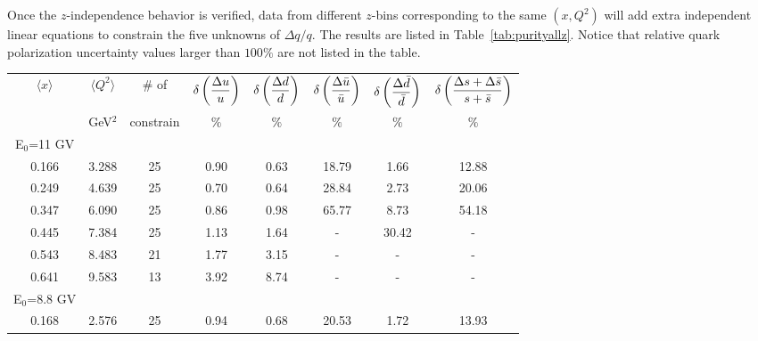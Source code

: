 Once the $z$-independence behavior is verified, data from different $z$-bins corresponding to the same $(x,Q^2)$ will add extra independent linear equations to constrain the five unknowns of $\Delta q/q$. The results are listed in Table~\ref{tab:purityallz}. Notice that relative quark polarization  uncertainty values larger than $100 \%$ are not listed in the table.  
%
\begin{table}[htbp]
\begin{center}
\begin{tabular}{|ccc||ccccc|}
\hline
$\langle x \rangle $   & $ \langle Q^2 \rangle $   &  \# of  & $\displaystyle{\delta \left({ \Delta u \over u} \right)}$  & $\displaystyle{\delta \left({ \Delta d \over d} \right)}$&
$\displaystyle{ \delta \left({ \Delta \bar{u} \over\bar{u}} \right)}$ & $\displaystyle{\delta \left({ \Delta \bar{d} \over\bar{d}} \right)}$ &  $\displaystyle{\delta \left({ \Delta s + \Delta  \bar{s} \over s+ \bar{s}} \right)}$  \\
                       & GeV$^2$            &       constrain    &  $\%$  &   $\%$    &  $\%$    &     $\%$    &       $\%$                                                   \\ \hline 
   E$_0$=11 GV  &    & &         &          &         &          &         \\
   0.166 &   3.288 & 25&        0.90 &         0.63 &        18.79 &         1.66 &        12.88 \\
   0.249 &   4.639 & 25&        0.70 &         0.64 &        28.84 &         2.73 &        20.06 \\
   0.347 &   6.090 & 25&        0.86 &         0.98 &        65.77 &         8.73 &        54.18 \\
   0.445 &   7.384 & 25&        1.13 &         1.64 &            - &        30.42 &            - \\
   0.543 &   8.483 & 21&        1.77 &         3.15 &            - &            - &            - \\
   0.641 &   9.583 & 13&        3.92 &         8.74 &            - &            - &            - \\
   E$_0$=8.8 GV  &    & &         &          &         &          &         \\
   0.168 &   2.576 & 25&        0.94 &         0.68 &        20.53 &         1.72 &        13.93 \\

\end{tabular}
\end{center}
\end{table}
